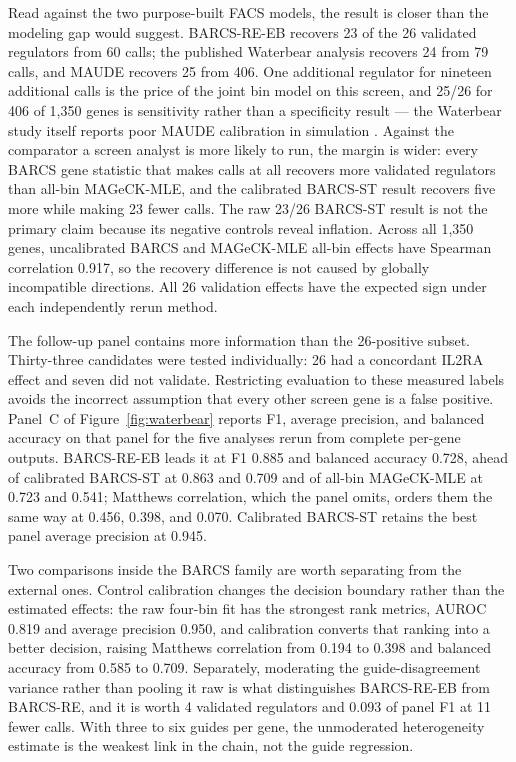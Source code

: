Read against the two purpose-built FACS models, the result is closer than the
modeling gap would suggest.  BARCS-RE-EB recovers 23 of the 26 validated
regulators from 60 calls; the published Waterbear analysis recovers 24 from 79
calls, and MAUDE recovers 25 from 406.  One additional regulator for nineteen
additional calls is the price of the joint bin model on this screen, and 25/26
for 406 of 1,350 genes is sensitivity rather than a specificity result --- the
Waterbear study itself reports poor MAUDE calibration in simulation
\citep{pimentel2024waterbear,deboer2020maude}.  Against the comparator a
screen analyst is more likely to run, the margin is wider: every BARCS gene
statistic that makes calls at all recovers more validated regulators than
all-bin MAGeCK-MLE, and the calibrated BARCS-ST result recovers five more
while making 23 fewer calls.  The raw 23/26 BARCS-ST result is not the primary
claim because its negative controls reveal inflation.  Across all 1,350 genes,
uncalibrated BARCS and MAGeCK-MLE all-bin effects have Spearman correlation
0.917, so the recovery difference is not caused by globally incompatible
directions.  All 26 validation effects have the expected sign under each
independently rerun method.

The follow-up panel contains more information than the 26-positive subset.
Thirty-three candidates were tested individually: 26 had a concordant IL2RA
effect and seven did not validate.  Restricting evaluation to these measured
labels avoids the incorrect assumption that every other screen gene is a false
positive.  Panel~C of Figure~\ref{fig:waterbear} reports F1, average
precision, and balanced accuracy on that panel for the five analyses rerun
from complete per-gene outputs.  BARCS-RE-EB leads it at F1 0.885 and balanced
accuracy 0.728, ahead of calibrated BARCS-ST at 0.863 and 0.709 and of all-bin
MAGeCK-MLE at 0.723 and 0.541; Matthews correlation, which the panel omits,
orders them the same way at 0.456, 0.398, and 0.070.  Calibrated BARCS-ST
retains the best panel average precision at 0.945.

Two comparisons inside the BARCS family are worth separating from the external
ones.  Control calibration changes the decision boundary rather than the
estimated effects: the raw four-bin fit has the strongest rank metrics, AUROC
0.819 and average precision 0.950, and calibration converts that ranking into
a better decision, raising Matthews correlation from 0.194 to 0.398 and
balanced accuracy from 0.585 to 0.709.  Separately, moderating the
guide-disagreement variance rather than pooling it raw is what distinguishes
BARCS-RE-EB from BARCS-RE, and it is worth 4 validated regulators and 0.093 of
panel F1 at 11 fewer calls.  With three to six guides per gene, the unmoderated
heterogeneity estimate is the weakest link in the chain, not the guide
regression.

